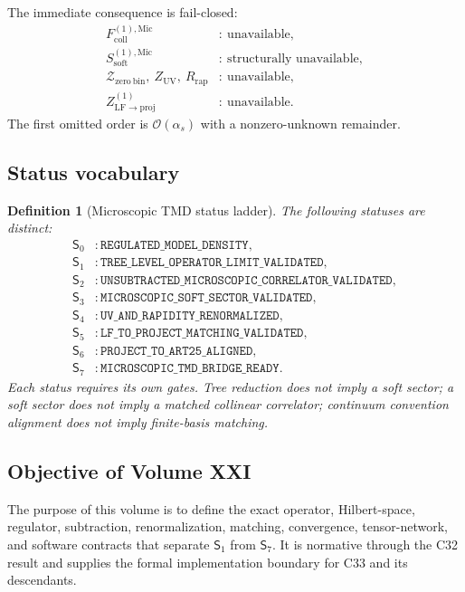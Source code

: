 \documentclass[11pt]{article}
\newtheorem{definition}{Definition}[section]
\newcommand{\cZ}{\mathcal Z}
\newcommand{\Coll}{\ensuremath{\mathrm{coll}}}
\newcommand{\Soft}{\ensuremath{\mathrm{soft}}}
\newcommand{\Proj}{\ensuremath{\mathrm{proj}}}
\newcommand{\Mic}{\ensuremath{\mathrm{Mic}}}
\newcommand{\order}{\mathcal O}
\newcommand{\as}{\alpha_s}
\begin{document}
The immediate consequence is fail-closed:
\begin{align}
 F_{\Coll}^{(1),\Mic} &:\ \text{unavailable},\\
 S_{\Soft}^{(1),\Mic} &:\ \text{structurally unavailable},\\
 \cZ_{\mathrm{zero\ bin}},\ Z_{\mathrm{UV}},\ R_{\mathrm{rap}}
 &:\ \text{unavailable},\\
 Z_{\mathrm{LF}\to\Proj}^{(1)}
 &:\ \text{unavailable}.
 \label{eq:c32-unavailable-chain}
\end{align}
The first omitted order is \(\order(\as)\) with a nonzero-unknown remainder.

\subsection{Status vocabulary}

\begin{definition}[Microscopic TMD status ladder]
\label{def:status-ladder}
The following statuses are distinct:
\begin{align}
 \mathsf S_0 &: \texttt{REGULATED\_MODEL\_DENSITY},\\
 \mathsf S_1 &: \texttt{TREE\_LEVEL\_OPERATOR\_LIMIT\_VALIDATED},\\
 \mathsf S_2 &: \texttt{UNSUBTRACTED\_MICROSCOPIC\_CORRELATOR\_VALIDATED},\\
 \mathsf S_3 &: \texttt{MICROSCOPIC\_SOFT\_SECTOR\_VALIDATED},\\
 \mathsf S_4 &: \texttt{UV\_AND\_RAPIDITY\_RENORMALIZED},\\
 \mathsf S_5 &: \texttt{LF\_TO\_PROJECT\_MATCHING\_VALIDATED},\\
 \mathsf S_6 &: \texttt{PROJECT\_TO\_ART25\_ALIGNED},\\
 \mathsf S_7 &: \texttt{MICROSCOPIC\_TMD\_BRIDGE\_READY}.
 \label{eq:status-ladder}
\end{align}
Each status requires its own gates.  Tree reduction does not imply a soft sector; a soft sector does not imply a matched collinear correlator; continuum convention alignment does not imply finite-basis matching.
\end{definition}

\subsection{Objective of Volume XXI}

The purpose of this volume is to define the exact operator, Hilbert-space, regulator, subtraction, renormalization, matching, convergence, tensor-network, and software contracts that separate \(\mathsf S_1\) from \(\mathsf S_7\).  It is normative through the C32 result and supplies the formal implementation boundary for C33 and its descendants.
\end{document}
